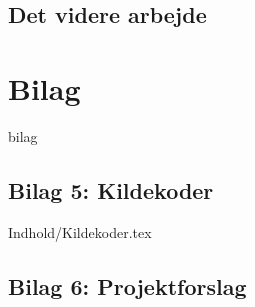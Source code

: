 \documentclass[12pt,a4paper]{report}
\begin{document}
           \section{Det videre arbejde}
	




\chapter*{Bilag}
 {bilag}

\section*{Bilag 5: Kildekoder}
 {Indhold/Kildekoder.tex}
\newpage
\section*{Bilag 6: Projektforslag}

\end{document}
